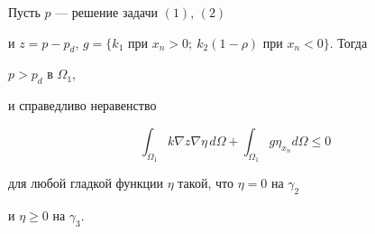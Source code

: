 \begin{lem}


Пусть $p$ --- решение задачи $(1)$, $(2)$


и $z=p-p_d$, $g = \{ k_1 \text{ при }


x_n > 0;\ k_2 (1 - \rho) \text{ при } x_n < 0 \}$. Тогда


$p > p_d \text{ в }\Omega_1$,


и справедливо неравенство


\begin{equation}


\int_{\Omega_1} k \nabla z \nabla \eta\, d \Omega + \int_{ \Omega_1 }g


\eta_{ x_n } d \Omega \leq 0


\end{equation}


для любой гладкой функции $\eta$ такой, что $\eta = 0$ на $\gamma_2$


и $\eta \geq 0$ на $\gamma_3$.


\end{lem}





